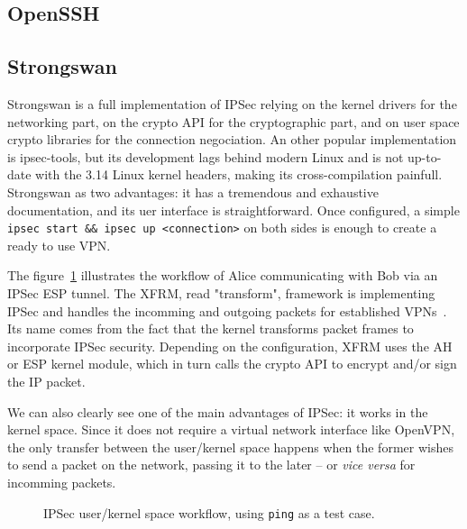 
\subsection{OpenSSH}


\subsection{Strongswan}
Strongswan is a full implementation of IPSec relying on the kernel drivers for the networking part, on the crypto API for the cryptographic part, and on user space crypto libraries for the connection negociation.
An other popular implementation is ipsec-tools, but its development lags behind modern Linux and is not up-to-date with the 3.14 Linux kernel headers, making its cross-compilation painfull.
Strongswan as two advantages: it has a tremendous and exhaustive documentation, and its uer interface is straightforward.
Once configured, a simple \texttt{ipsec start \&\& ipsec up <connection>} on both sides is enough to create a ready to use VPN.

The figure~\ref{fig:ipsec-workflow} illustrates the workflow of Alice communicating with Bob via an IPSec ESP tunnel.
The XFRM, read "transform", framework is implementing IPSec and handles the incomming and outgoing packets for established VPNs~\cite{rosen2014}.
Its name comes from the fact that the kernel transforms packet frames to incorporate IPSec security.
Depending on the configuration, XFRM uses the AH or ESP kernel module, which in turn calls the crypto API to encrypt and/or sign the IP packet.

We can also clearly see one of the main advantages of IPSec: it works in the kernel space.
Since it does not require a virtual network interface like OpenVPN, the only transfer between the user/kernel space happens when the former wishes to send a packet on the network, passing it to the later -- or \textit{vice versa} for incomming packets.

\begin{figure}[ht]
\Large
\resizebox{\linewidth}{!}{%

}
\caption{IPSec user/kernel space workflow, using \texttt{ping} as a test case.}
\label{fig:ipsec-workflow}
\end{figure}


